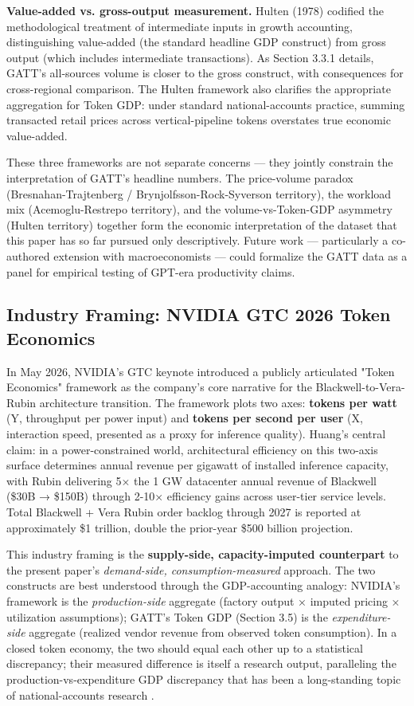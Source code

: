 \documentclass[11pt,a4paper]{article}
\begin{document}
\textbf{Value-added vs. gross-output measurement.} Hulten (1978) \cite{hulten1978growth} codified the methodological treatment of intermediate inputs in growth accounting, distinguishing value-added (the standard headline GDP construct) from gross output (which includes intermediate transactions). As Section 3.3.1 details, GATT's all-sources volume is closer to the gross construct, with consequences for cross-regional comparison. The Hulten framework also clarifies the appropriate aggregation for Token GDP: under standard national-accounts practice, summing transacted retail prices across vertical-pipeline tokens overstates true economic value-added.

These three frameworks are not separate concerns --- they jointly constrain the interpretation of GATT's headline numbers. The price-volume paradox (Bresnahan-Trajtenberg / Brynjolfsson-Rock-Syverson territory), the workload mix (Acemoglu-Restrepo territory), and the volume-vs-Token-GDP asymmetry (Hulten territory) together form the economic interpretation of the dataset that this paper has so far pursued only descriptively. Future work --- particularly a co-authored extension with macroeconomists --- could formalize the GATT data as a panel for empirical testing of GPT-era productivity claims.

\subsection{Industry Framing: NVIDIA GTC 2026 Token Economics}

In May 2026, NVIDIA's GTC keynote \cite{huang2026gtc} introduced a publicly articulated "Token Economics" framework as the company's core narrative for the Blackwell-to-Vera-Rubin architecture transition. The framework plots two axes: \textbf{tokens per watt} (Y, throughput per power input) and \textbf{tokens per second per user} (X, interaction speed, presented as a proxy for inference quality). Huang's central claim: in a power-constrained world, architectural efficiency on this two-axis surface determines annual revenue per gigawatt of installed inference capacity, with Rubin delivering 5× the 1 GW datacenter annual revenue of Blackwell (\$30B → \$150B) through 2-10× efficiency gains across user-tier service levels. Total Blackwell + Vera Rubin order backlog through 2027 is reported at approximately \$1 trillion, double the prior-year \$500 billion projection.

This industry framing is the \textbf{supply-side, capacity-imputed counterpart} to the present paper's \emph{demand-side, consumption-measured} approach. The two constructs are best understood through the GDP-accounting analogy: NVIDIA's framework is the \emph{production-side} aggregate (factory output × imputed pricing × utilization assumptions); GATT's Token GDP (Section 3.5) is the \emph{expenditure-side} aggregate (realized vendor revenue from observed token consumption). In a closed token economy, the two should equal each other up to a statistical discrepancy; their measured difference is itself a research output, paralleling the production-vs-expenditure GDP discrepancy that has been a long-standing topic of national-accounts research \cite{hulten1978growth}.
\end{document}

